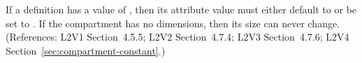 If a \Compartment definition has a  value of
, then its  attribute value must either default to or be
set to .  If the compartment has no dimensions, then its size can
never change.  (References: L2V1 Section~4.5.5; L2V2 Section~4.7.4; L2V3
Section~4.7.6; L2V4 Section~\ref{sec:compartment-constant}.)
